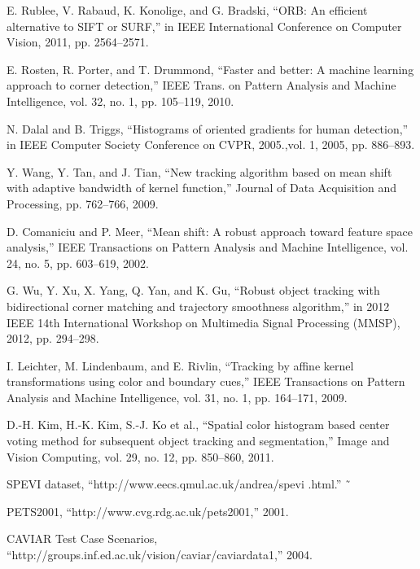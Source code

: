 \documentclass[paper=a4, fontsize=12pt]{article} %
\begin{document}
\begin{thebibliography}{9}
\begin{LTRitems}
E. Rublee, V. Rabaud, K. Konolige, and G. Bradski, “ORB: An efficient alternative to SIFT or SURF,” in IEEE International Conference on Computer Vision, 2011, pp. 2564–2571.

E. Rosten, R. Porter, and T. Drummond, “Faster and better: A machine learning approach to corner detection,” IEEE Trans. on Pattern Analysis and Machine Intelligence, vol. 32, no. 1, pp. 105–119, 2010.

N. Dalal and B. Triggs, “Histograms of oriented gradients for human detection,” in IEEE Computer Society Conference on CVPR, 2005.,vol. 1, 2005, pp. 886–893.

Y. Wang, Y. Tan, and J. Tian, “New tracking algorithm based on mean shift with adaptive bandwidth of kernel function,” Journal of Data Acquisition and Processing, pp. 762–766, 2009.

D. Comaniciu and P. Meer, “Mean shift: A robust approach toward feature space analysis,” IEEE Transactions on Pattern Analysis and Machine Intelligence, vol. 24, no. 5, pp. 603–619, 2002.

G. Wu, Y. Xu, X. Yang, Q. Yan, and K. Gu, “Robust object tracking with bidirectional corner matching and trajectory smoothness algorithm,” in 2012 IEEE 14th International Workshop on Multimedia Signal Processing (MMSP), 2012, pp. 294–298.

I. Leichter, M. Lindenbaum, and E. Rivlin, “Tracking by affine kernel
transformations using color and boundary cues,” IEEE Transactions on
Pattern Analysis and Machine Intelligence, vol. 31, no. 1, pp. 164–171,
2009.

D.-H. Kim, H.-K. Kim, S.-J. Ko et al., “Spatial color histogram based
center voting method for subsequent object tracking and segmentation,”
Image and Vision Computing, vol. 29, no. 12, pp. 850–860, 2011.

SPEVI dataset, “http://www.eecs.qmul.ac.uk/andrea/spevi .html.” ˜

PETS2001, “http://www.cvg.rdg.ac.uk/pets2001,” 2001.

CAVIAR Test Case Scenarios, “http://groups.inf.ed.ac.uk/vision/caviar/caviardata1,” 2004.

\bibitem{}



\end{LTRitems}
\end{thebibliography}
\end{document}

